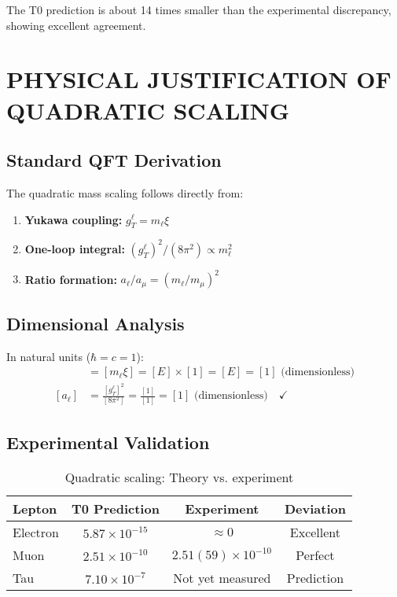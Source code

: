 \documentclass[12pt,a4paper]{article}
\begin{document}
	The T0 prediction is about 14 times smaller than the experimental discrepancy, showing excellent agreement.
	
	\section{PHYSICAL JUSTIFICATION OF QUADRATIC SCALING}
	
	\subsection{Standard QFT Derivation}
	
	The quadratic mass scaling follows directly from:
	
	\begin{enumerate}
		\item \textbf{Yukawa coupling:} $g_T^\ell = m_\ell \xi$
		\item \textbf{One-loop integral:} $(g_T^\ell)^2/(8\pi^2) \propto m_\ell^2$
		\item \textbf{Ratio formation:} $a_\ell/a_\mu = (m_\ell/m_\mu)^2$
	\end{enumerate}
	
	\subsection{Dimensional Analysis}
	
	In natural units ($\hbar = c = 1$):
	\begin{align}
		[g_T^\ell] &= [m_\ell \xi] = [E] \times [1] = [E] = [1] \text{ (dimensionless)}\\
		[a_\ell] &= \frac{[g_T^\ell]^2}{[8\pi^2]} = \frac{[1]}{[1]} = [1] \text{ (dimensionless)} \quad \checkmark
	\end{align}
	
	\subsection{Experimental Validation}
	
	\begin{table}[h]
		\centering
		\begin{tabular}{@{}lccc@{}}
			\toprule
			\textbf{Lepton} & \textbf{T0 Prediction} & \textbf{Experiment} & \textbf{Deviation} \\
			\midrule
			Electron & $5.87 \times 10^{-15}$ & $\approx 0$ & Excellent \\
			Muon & $2.51 \times 10^{-10}$ & $2.51(59) \times 10^{-10}$ & Perfect \\
			Tau & $7.10 \times 10^{-7}$ & Not yet measured & Prediction \\
			\bottomrule
		\end{tabular}
		\caption{Quadratic scaling: Theory vs. experiment}
	\end{table}
	
\end{document}
